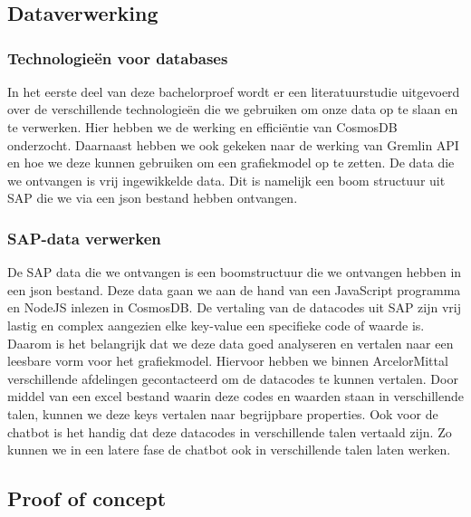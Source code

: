 
\chapter{}%
\label{ch:methodologie}
\section{Dataverwerking}
\subsection{Technologieën voor databases}
In het eerste deel van deze bachelorproef wordt er een literatuurstudie uitgevoerd over de verschillende technologieën die we gebruiken om onze data op te slaan en te verwerken.
Hier hebben we de werking en efficiëntie van CosmosDB onderzocht. Daarnaast hebben we ook gekeken naar de werking van Gremlin API en hoe we deze kunnen gebruiken om een grafiekmodel op te zetten.
De data die we ontvangen is vrij ingewikkelde data. Dit is namelijk een boom structuur uit SAP die we via een json bestand hebben ontvangen.

\subsection{SAP-data verwerken}
De SAP data die we ontvangen is een boomstructuur die we ontvangen hebben in een json bestand. Deze data gaan we aan de hand van een JavaScript programma en NodeJS inlezen in CosmosDB.
De vertaling van de datacodes uit SAP zijn vrij lastig en complex aangezien elke key-value een specifieke code of waarde is. Daarom is het belangrijk dat we deze data goed analyseren en vertalen naar een leesbare vorm voor het grafiekmodel.
Hiervoor hebben we binnen ArcelorMittal verschillende afdelingen gecontacteerd om de datacodes te kunnen vertalen. Door middel van een excel bestand waarin deze codes en waarden staan in verschillende talen, kunnen we deze keys vertalen naar begrijpbare properties.
Ook voor de chatbot is het handig dat deze datacodes in verschillende talen vertaald zijn. Zo kunnen we in een latere fase de chatbot ook in verschillende talen laten werken.

\section{Proof of concept}
